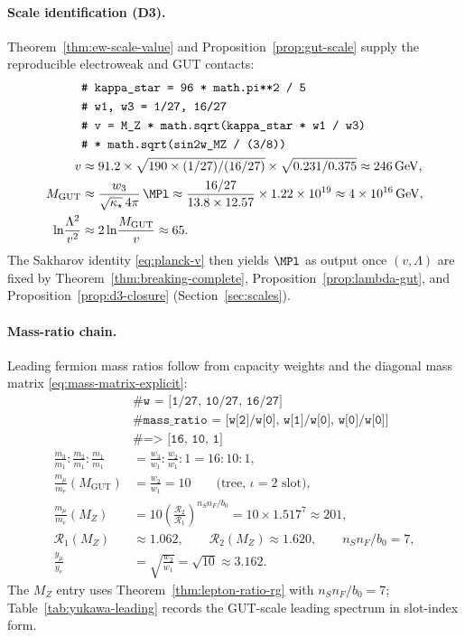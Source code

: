 \paragraph{Scale identification (D3).}
Theorem~\ref{thm:ew-scale-value} and Proposition~\ref{prop:gut-scale} supply
the reproducible electroweak and GUT contacts:
\begin{equation}\label{eq:workbook-planck}
\begin{aligned}
  &\texttt{\# kappa\_star = 96 * math.pi**2 / 5}\\
  &\texttt{\# w1, w3 = 1/27, 16/27}\\
  &\texttt{\# v = M\_Z * math.sqrt(kappa\_star * w1 / w3)}\\
  &\texttt{\#      * math.sqrt(sin2w\_MZ / (3/8))}\\
  v
  &\approx 91.2\times\sqrt{190\times(1/27)/(16/27)}\times\sqrt{0.231/0.375}
  \approx 246\,\mathrm{GeV},\\
  M_{\mathrm{GUT}}
  &\approx \frac{w_3}{\sqrt{\kappa_\star}\,4\pi}\,\MPl
  \approx \frac{16/27}{13.8\times 12.57}\times 1.22\times 10^{19}
  \approx 4\times 10^{16}\,\mathrm{GeV},\\
  \ln\!\frac{\Lambda^2}{v^2}
  &\approx 2\ln\!\frac{M_{\mathrm{GUT}}}{v}
  \approx 65.
\end{aligned}
\end{equation}
The Sakharov identity \eqref{eq:planck-v} then yields $\MPl$ as output once
$(v,\Lambda)$ are fixed by Theorem~\ref{thm:breaking-complete},
Proposition~\ref{prop:lambda-gut}, and Proposition~\ref{prop:d3-closure}
(Section~\ref{sec:scales}).

\paragraph{Mass-ratio chain.}
Leading fermion mass ratios follow from capacity weights and the diagonal mass
matrix \eqref{eq:mass-matrix-explicit}:
\begin{equation}\label{eq:workbook-mass-ratio}
\begin{aligned}
  &\texttt{\# w = [1/27, 10/27, 16/27]}\\
  &\texttt{\# mass\_ratio = [w[2]/w[0], w[1]/w[0], w[0]/w[0]]}\\
  &\texttt{\# => [16, 10, 1]}\\
  \frac{m_3}{m_1}:\frac{m_2}{m_1}:\frac{m_1}{m_1}
  &= \frac{w_3}{w_1}:\frac{w_2}{w_1}:1
  = 16:10:1,\\
  \frac{m_\mu}{m_e}(M_{\mathrm{GUT}})
  &= \frac{w_2}{w_1}
  = 10
  \qquad\text{(tree, $\iota=2$ slot)},\\
  \frac{m_\mu}{m_e}(M_Z)
  &= 10\left(\frac{\mathcal{R}_2}{\mathcal{R}_1}\right)^{n_S n_F/b_0}
  = 10\times 1.517^7
  \approx 201,\\
  \mathcal{R}_1(M_Z)
  &\approx 1.062,
  \qquad
  \mathcal{R}_2(M_Z)\approx 1.620,
  \qquad
  n_S n_F/b_0=7,\\
  \frac{y_\mu}{y_e}
  &= \sqrt{\frac{w_2}{w_1}}
  = \sqrt{10}
  \approx 3.162.
\end{aligned}
\end{equation}
The $M_Z$ entry uses Theorem~\ref{thm:lepton-ratio-rg} with
$n_S n_F/b_0=7$; Table~\ref{tab:yukawa-leading} records the GUT-scale
leading spectrum in slot-index form.

